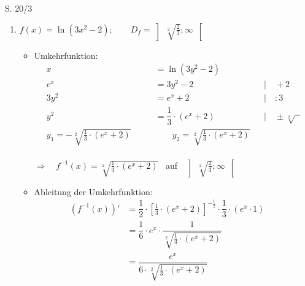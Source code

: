\begin{Exercise}{S. 20/3}{}
\begin{enumerate}
\begin{enumerate}[label=\alph*)]
{\begin{itemize}[leftmargin=*]
{\begin{align*}
                            &= -\dfrac{1}{x \cdot \sqrt[2]{-2 \cdot \ln(\dfrac{1}{2} \cdot x)}} &&
                        \end{align*}
                        }
                \end{itemize}
                }
            \item[e)] {
                $f(x) = \ln\left(3x^2 -2\right); \qquad D_{f} = \left] \ \sqrt[2]{\frac{2}{3}}; \infty \ \right[$\\[-2.0ex]
                \begin{itemize}[leftmargin=*]
                    \item Umkehrfunktion: \\{
                        \vspace{-2.0ex}
                        \begin{align*}
                            x &= \ln\left(3y^2 -2\right) &&\\[1.5ex]
                            e^{x} &= 3y^2 - 2 &&| \quad +2\\[1.5ex]
                            3y^{2} &= e^{x} + 2 &&| \quad  :3\\[1.5ex]
                            y^2 &= \dfrac{1}{3} \cdot \left(e^{x} + 2\right) &&| \quad \pm \sqrt[2]{\phantom{x}}\\[1.5ex]
                            y_{1} = -\sqrt[2]{\frac{1}{3} \cdot \left(e^{x} + 2\right)} \qquad & \qquad y_{2} = \sqrt[2]{\frac{1}{3} \cdot \left(e^{x} + 2\right)} &&
                        \end{align*}\\[-1.0ex]
                        $\Rightarrow \quad f^{-1}(x) = \sqrt[2]{\frac{1}{3} \cdot \left(e^{x} + 2\right)}$ \ auf \ $\left] \ \sqrt[2]{\frac{2}{3}}; \infty \ \right[$\\[-1.0ex]
                        }
                    \item Ableitung der Umkehrfunktion: \\[-2.0ex]{
                        \begin{align*}
                            \left(f^{-1}(x)\right)' &= \dfrac{1}{2} \cdot \left[\frac{1}{3} \cdot \left(e^{x} + 2\right)\right]^{-\frac{1}{2}} \cdot \dfrac{1}{3} \cdot \left(e^{x} \cdot 1\right) && \\[2.0ex]
                            &= \dfrac{1}{6} \cdot e^{x} \cdot \dfrac{1}{\sqrt[2]{\frac{1}{3} \cdot \left(e^{x} + 2\right)}} &&\\[2.0ex]
                            &= \dfrac{e^{x}}{6 \cdot \sqrt[2]{\frac{1}{3} \cdot \left(e^{x} + 2\right)}}&&

\end{align*}}
\end{itemize}}
\end{enumerate}
\end{enumerate}
\end{Exercise}

